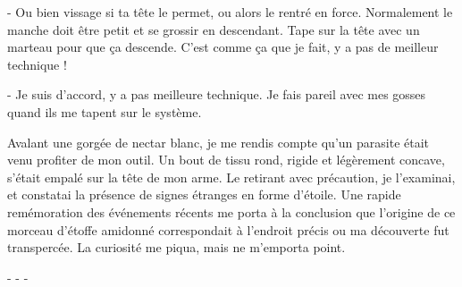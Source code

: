 \documentclass[12pt,a4paper,article]{memoir} %
\begin{document}
	- Ou bien vissage si ta t\^{e}te le permet, ou alors le rentr\'{e} en force.\newline
	Normalement le manche doit \^{e}tre petit et se grossir en descendant.\newline
	Tape sur la t\^{e}te avec un marteau pour que \c{c}a descende.\newline
	C'est comme \c{c}a que je fait, y a pas de meilleur technique !\newline
	
	\newline
	
	- Je suis d'accord, y a pas meilleure technique.\newline
	Je fais pareil avec mes gosses quand ils me tapent sur le syst\`{e}me.
\newline

Avalant une gorg\'{e}e de nectar blanc, je me rendis compte qu'un parasite \'{e}tait venu profiter de mon outil. Un bout de tissu rond, rigide et l\'{e}g\`{e}rement
concave, s'\'{e}tait empal\'{e} sur la t\^{e}te de mon arme. Le retirant avec pr\'{e}caution, je l'examinai, et constatai la pr\'{e}sence de signes \'{e}tranges en forme d'\'{e}toile. Une rapide rem\'{e}moration des \'{e}v\'{e}nements r\'{e}cents me porta \`{a} la conclusion que l'origine de ce morceau d'\'{e}toffe amidonn\'{e} correspondait \`{a} l'endroit pr\'{e}cis ou ma d\'{e}couverte fut transperc\'{e}e. La curiosit\'{e} me piqua, mais ne m'emporta point.

\centerline{- - -}
\end{document}
